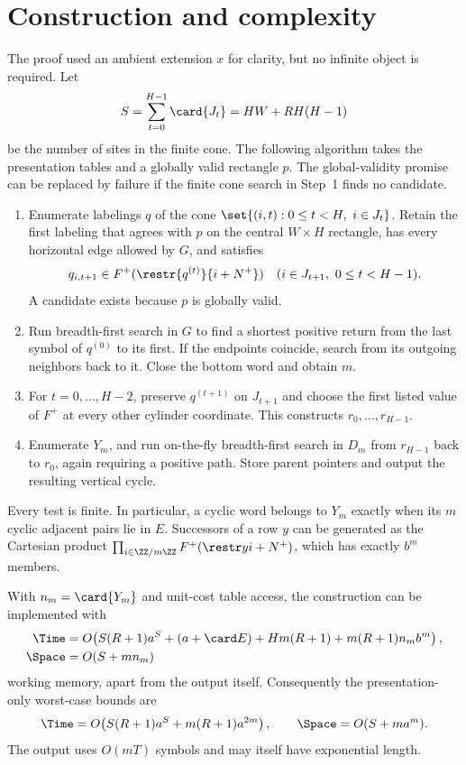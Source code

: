 \section{Construction and complexity}\label{sec:algorithm}

The proof used an ambient extension $x$ for clarity, but no infinite object is required.  Let
\begin{equation}\label{eq:S}
 S=\sum_{t=0}^{H-1}\card{J_t}
   =HW+RH(H-1)
\end{equation}
be the number of sites in the finite cone.  The following algorithm takes the presentation tables and a globally valid rectangle $p$.  The global-validity promise can be replaced by failure if the finite cone search in Step~1 finds no candidate.

\begin{enumerate}
\item Enumerate labelings $q$ of the cone
      $\set{(i,t):0\leq t<H,\ i\in J_t}$.  Retain the first labeling that agrees with $p$ on the central $W\times H$ rectangle, has every horizontal edge allowed by $G$, and satisfies
      \[
      q_{i,t+1}\in F^+(\restr{q^{(t)}}{i+N^+})
      \quad(i\in J_{t+1},\ 0\leq t<H-1).
      \]
      A candidate exists because $p$ is globally valid.
\item Run breadth-first search in $G$ to find a shortest positive return from the last symbol of $q^{(0)}$ to its first.  If the endpoints coincide, search from its outgoing neighbors back to it.  Close the bottom word and obtain $m$.
\item For $t=0,\ldots,H-2$, preserve $q^{(t+1)}$ on $J_{t+1}$ and choose the first listed value of $F^+$ at every other cylinder coordinate.  This constructs $r_0,\ldots,r_{H-1}$.
\item Enumerate $Y_m$, and run on-the-fly breadth-first search in $D_m$ from $r_{H-1}$ back to $r_0$, again requiring a positive path.  Store parent pointers and output the resulting vertical cycle.
\end{enumerate}

Every test is finite.  In particular, a cyclic word belongs to $Y_m$ exactly when its $m$ cyclic adjacent pairs lie in $E$.  Successors of a row $y$ can be generated as the Cartesian product
$\prod_{i\in\ZZ/m\ZZ}F^+(\restr y{i+N^+})$, which has exactly $b^m$ members.

\begin{proposition}\label{prop:complexity}
With $n_m=\card{Y_m}$ and unit-cost table access, the construction can be implemented with
\begin{align*}
\Time={}&O\!\left(S(R+1)a^S+(a+\card E)
        +Hm(R+1)+m(R+1)n_m b^m\right),\\
\Space={}&O\!\left(S+mn_m\right)
\end{align*}
working memory, apart from the output itself.  Consequently the presentation-only worst-case bounds are
\[
 \Time=O\!\left(S(R+1)a^S+m(R+1)a^{2m}\right),
 \qquad
 \Space=O(S+ma^m).
\]
The output uses $O(mT)$ symbols and may itself have exponential length.
\end{proposition}

